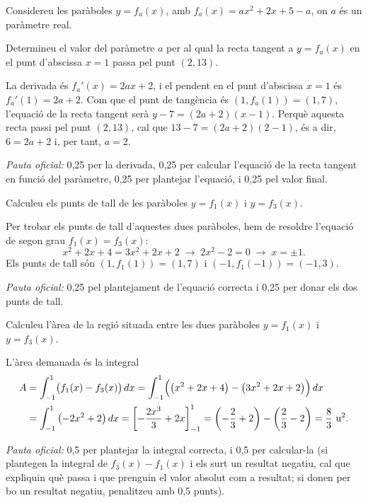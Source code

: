 Considereu les paràboles $y=f_a(x)$, amb $f_a(x)=ax^2+2x+5-a$, on $a$ és un paràmetre real.

\begin{apartats}

Determineu el valor del paràmetre $a$ per al qual la recta tangent a $y=f_a(x)$ en el punt d'abscissa $x=1$
passa pel punt $(2,13)$.

\begin{solucio}
La derivada és $f_a'(x)=2ax+2$, i el pendent en el punt d'abscissa $x=1$ és $f_a'(1)=2a+2$. Com que el punt de
tangència és $(1,f_a(1))=(1,7)$, l'equació de la recta tangent serà $y-7=(2a+2)(x-1)$. Perquè aquesta recta
passi pel punt $(2,13)$, cal que $13-7=(2a+2)(2-1)$, és a dir, $6=2a+2$ i, per tant, $a=2$.

\textit{Pauta oficial:} 0,25 per la derivada, 0,25 per calcular l'equació de la recta tangent en funció del
paràmetre, 0,25 per plantejar l'equació, i 0,25 pel valor final.
\end{solucio}

Calculeu els punts de tall de les paràboles $y=f_1(x)$ i $y=f_3(x)$.

\begin{solucio}
Per trobar els punts de tall d'aquestes dues paràboles, hem de resoldre l'equació de segon grau
$f_1(x)=f_3(x)$:
\[
x^2+2x+4=3x^2+2x+2\;\rightarrow\;2x^2-2=0\;\rightarrow\;x=\pm1 .
\]
Els punts de tall són $(1,f_1(1))=(1,7)$ i $(-1,f_1(-1))=(-1,3)$.

\textit{Pauta oficial:} 0,25 pel plantejament de l'equació correcta i 0,25 per donar els dos punts de tall.
\end{solucio}

Calculeu l'àrea de la regió situada entre les dues paràboles $y=f_1(x)$ i $y=f_3(x)$.

\begin{solucio}
L'àrea demanada és la integral
\begin{align*}
A&=\int_{-1}^1\bigl(f_1(x)-f_3(x)\bigr)\,dx=\int_{-1}^1\Bigl(\left(x^2+2x+4\right)-\left(3x^2+2x+2\right)\Bigr)\,dx\\
&=\int_{-1}^1\left(-2x^2+2\right)dx=\left[-\frac{2x^3}{3}+2x\right]_{-1}^1
=\left(-\frac23+2\right)-\left(\frac23-2\right)=\frac83\ \text{u}^2 .
\end{align*}

\textit{Pauta oficial:} 0,5 per plantejar la integral correcta, i 0,5 per calcular-la (si plantegen la integral
de $f_3(x)-f_1(x)$ i els surt un resultat negatiu, cal que expliquin què passa i que prenguin el valor absolut
com a resultat; si donen per bo un resultat negatiu, penalitzeu amb 0,5 punts).
\end{solucio}

\end{apartats}
